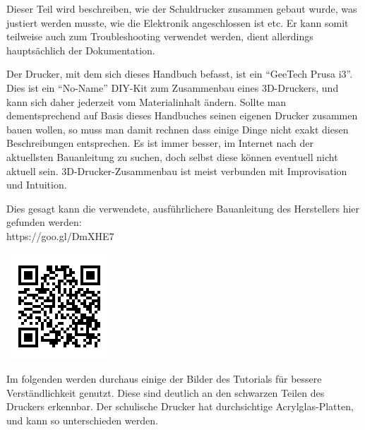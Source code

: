 Dieser Teil wird beschreiben, wie der Schuldrucker zusammen gebaut wurde, was justiert werden musste, wie die Elektronik angeschlossen ist etc.
Er kann somit teilweise auch zum Troubleshooting verwendet werden, dient allerdings hauptsächlich der Dokumentation.

Der Drucker, mit dem sich dieses Handbuch befasst, ist ein "`GeeTech Prusa i3"'. Dies ist ein "`No-Name"' DIY-Kit zum Zusammenbau eines 3D-Druckers, und kann sich daher jederzeit vom Materialinhalt ändern. Sollte man dementsprechend auf Basis dieses Handbuches seinen eigenen Drucker zusammen bauen wollen, so muss man damit rechnen dass einige Dinge nicht exakt diesen Beschreibungen entsprechen. Es ist immer besser, im Internet nach der aktuellsten Bauanleitung zu suchen, doch selbst diese können eventuell nicht aktuell sein. 3D-Drucker-Zusammenbau ist meist verbunden mit Improvisation und Intuition.

Dies gesagt kann die verwendete, ausführlichere Bauanleitung des Herstellers hier gefunden werden:\\
https://goo.gl/DmXHE7
\begin{center}
\includegraphics{Bilder/Anleitung_QRCode.png}
\end{center}
Im folgenden werden durchaus einige der Bilder des Tutorials für bessere Verständlichkeit genutzt. Diese sind deutlich an den schwarzen Teilen des Druckers erkennbar. Der schulische Drucker hat durchsichtige Acrylglas-Platten, und kann so unterschieden werden.


